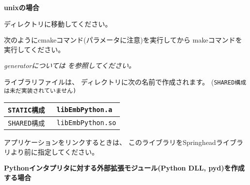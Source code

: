\medskip
\bf{unixの場合}
\begin{narrow}
	ディレクトリに移動してください。

	次のようにcmakeコマンド(パラメータに注意)を実行してから
	makeコマンドを実行してください。


	\begin{narrow}[s]
		\it{generator}については
		 を参照してください。
	\end{narrow}

	\medskip
	ライブラリファイルは、
	ディレクトリに次の名前で作成されます。
	(\tt{SHARED}構成は未だ実装されていません)

	\medskip
	\begin{center}
	\begin{tabular}{l@{\ \ ---\ \ }l}\hline
		\tt{STATIC}構成 & \tt{libEmbPython.a}\\\hline
		\tt{SHARED}構成 & \tt{libEmbPython.so}\\\hline
	\end{tabular}
	\end{center}

	\bigskip
	アプリケーションをリンクするときは、
	このライブラリをSpringheadライブラリより前に指定してください。
\end{narrow}

\bigskip
\thinrule{\linewidth}

\noindent
\bf{Pythonインタプリタに対する外部拡張モジュール(Python DLL, pyd)を作成する場合}

